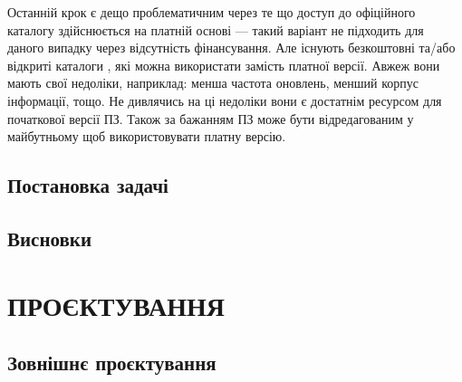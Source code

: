 \documentclass[14pt]{extarticle}
\let\oldsection\section
\renewcommand{\section}{\clearpage\oldsection}
\begin{document}
  Останній крок є дещо проблематичним
  через те що доступ до офіційного каталогу здійснюється на платній основі ---
  такий варіант не підходить для даного випадку через відсутність фінансування.
  Але існують безкоштовні та/або відкриті каталоги
  \cite{udc_summary} \cite{udc_summary_linked},
  які можна використати замість платної версії.
  Авжеж вони мають свої недоліки, наприклад: менша частота оновлень,
  менший корпус інформації, тощо.
  Не дивлячись на ці недоліки
  вони є достатнім ресурсом для початкової версії ПЗ.
  Також за бажанням ПЗ може бути відредагованим
  у майбутньому щоб використовувати платну версію.

  \subsection{Постановка задачі}
  \lipsum[1-3]
  \subsection{Висновки}
  \BgThispage
  \lipsum[1-3]
  \BgThispage

  \section{ПРОЄКТУВАННЯ}
  \subsection{Зовнішнє проєктування}
\end{document}
